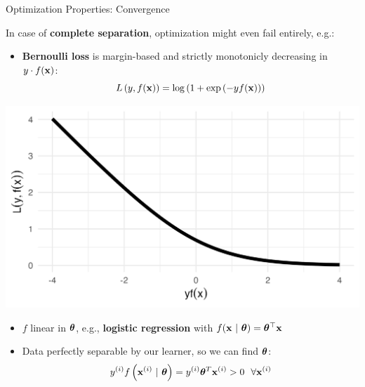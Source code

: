 \documentclass[11pt,compress,t,notes=noshow, xcolor=table]{beamer}
\begin{document}
\begin{vbframe}{Optimization Properties: Convergence}

\footnotesize

In case of \textbf{complete separation}, optimization might even 
fail entirely, e.g.:

\vspace{0.5cm}

\begin{minipage}{0.7\textwidth}
  \begin{itemize}
    \item \textbf{Bernoulli loss} is margin-based and strictly monotonicly decreasing in
    $y \cdot f(\mathbf{x})$: 
    $$L\left(y, f(\mathbf{x})\right) = \log \left( 1 + \exp \left( - y  f(\mathbf{x}) \right)\right)$$
  \end{itemize}
\end{minipage}%
\begin{minipage}{0.05\textwidth}
  \phantom{foo}
\end{minipage}%
\begin{minipage}{0.25\textwidth}
  \includegraphics[width=\textwidth]{figure/bernoulli.png}
\end{minipage}%

\begin{itemize}
  \item $f$ linear in $\bm{\theta}$, e.g.,
  \textbf{logistic regression} with $f(\mathbf{x} ~|~ \bm{\theta}) = \bm{\theta}^\top \mathbf{x}$
  \item Data perfectly separable by our learner, so we can find $\bm{\theta}$:
   $$ y^{(i)} f\left(\mathbf{x}^{(i)} ~|~ \bm{\theta}\right) = y^{(i)} \bm{\theta}^T \mathbf{x}^{(i)} > 0 ~~ \forall \mathbf{x}^{(i)}$$


\end{itemize}
\end{vbframe}
\end{document}
